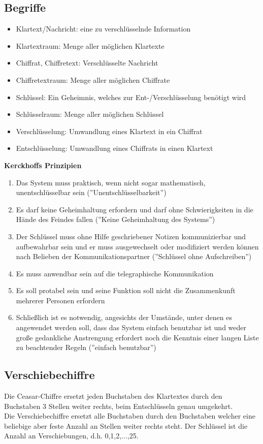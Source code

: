 \documentclass[a4paper,12pt,leqno]{article}
\begin{document}
\subsection{Begriffe}
\begin{itemize}
\item Klartext/Nachricht: eine zu verschlüsselnde Information
\item Klartextraum: Menge aller möglichen Klartexte
\item Chiffrat, Chiffretext: Verschlüsselte Nachricht
\item Chiffretextraum: Menge aller möglichen Chiffrate
\item Schlüssel: Ein Geheimnis, welches zur Ent-/Verschlüsselung benötigt wird
\item Schlüsselraum: Menge aller möglichen Schlüssel
\item Verschlüsselung: Umwandlung eines Klartext in ein Chiffrat
\item Entschlüsselung: Umwandlung eines Chiffrats in einen Klartext
\end{itemize}
\textbf{Kerckhoffs Prinzipien}
\begin{enumerate}
\item Das System muss praktisch, wenn nicht sogar mathematisch, unentschlüsselbar sein (''Unentschlüsselbarkeit'')
\item Es darf keine Geheimhaltung erfordern und darf ohne Schwierigkeiten  in die Hände des Feindes fallen (''Keine Geheimhaltung des Systems'')
\item Der Schlüssel muss ohne Hilfe geschriebener Notizen kommunizierbar und aufbewahrbar sein und er muss ausgewechselt oder modifiziert werden können nach Belieben der Kommunikationspartner (''Schlüssel ohne Aufschreiben'')
\item Es muss anwendbar sein auf die telegraphische Kommunikation
\item Es soll protabel sein und seine Funktion soll nicht die Zusammenkunft mehrerer Personen erfordern 
\item Schließlich ist es notwendig, angesichts der Umstände, unter denen es angewendet werden soll, dass das System einfach benutzbar ist und weder große gedankliche Anstrengung erfordert noch die Kenntnis einer langen Liste zu beachtender Regeln (''einfach benutzbar'')
\end{enumerate}
\subsection{Verschiebechiffre}
Die Ceasar-Chiffre ersetzt jeden Buchstaben des Klartextes durch den Buchstaben 3 Stellen weiter rechts, beim Entschlüsseln genau umgekehrt.\\
Die Verschiebechiffre ersetzt alle Buchstaben durch den Buchstaben welcher eine beliebige aber feste Anzahl an Stellen weiter rechts steht. Der Schlüssel ist die Anzahl an Verschiebungen, d.h. 0,1,2,...,25.
\end{document}
